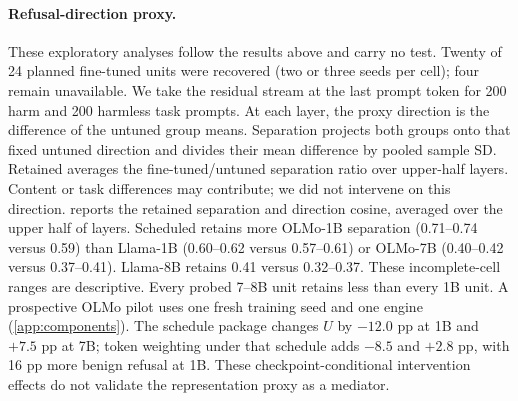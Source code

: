 \documentclass{article}
\begin{document}
\paragraph{Refusal-direction proxy.} These exploratory analyses follow the
results above and carry no test. Twenty of 24 planned fine-tuned units were
recovered (two or three seeds per cell); four remain unavailable. We take
the residual stream at the last prompt token for 200 harm and 200 harmless
task prompts. At each layer, the proxy direction is the difference of the
untuned group means. Separation projects both groups onto that fixed untuned
direction and divides their mean difference by pooled sample SD. Retained
averages the fine-tuned/untuned separation ratio over upper-half layers.
Content or task differences may contribute; we did not intervene on this direction.  reports the retained
separation and direction cosine, averaged over the upper half of layers.
Scheduled retains more OLMo-1B separation (0.71--0.74 versus 0.59) than
Llama-1B (0.60--0.62 versus 0.57--0.61) or OLMo-7B (0.40--0.42 versus
0.37--0.41). Llama-8B retains 0.41 versus 0.32--0.37. These incomplete-cell
ranges are descriptive. Every probed 7--8B unit retains less than every 1B unit.
A prospective OLMo pilot uses one fresh training seed and one engine
(\cref{app:components}). The schedule package changes $U$ by $-12.0$ pp at
1B and $+7.5$ pp at 7B; token weighting under that schedule adds $-8.5$ and
$+2.8$ pp, with 16 pp more benign refusal at 1B. These checkpoint-conditional
intervention effects do not validate the representation proxy as a mediator.
\end{document}
